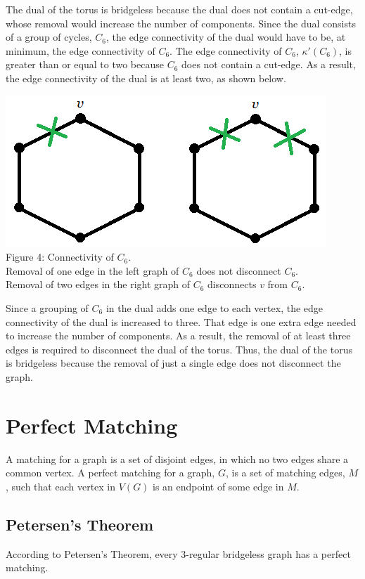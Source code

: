 \documentclass[12pt]{article}
\begin{document}
\begin{flushleft}
\medskip
The dual of the torus is bridgeless because the dual does not contain a cut-edge, whose removal would increase the number of components. Since the dual consists of a group of cycles, $C_6$, the edge connectivity of the dual would have to be, at minimum, the edge connectivity of $C_6$. The edge connectivity of $C_6$, $\kappa'(C_6)$, is greater than or equal to two because $C_6$ does not contain a cut-edge. As a result, the edge connectivity of the dual is at least two, as shown below.

\begin{center}
\includegraphics[scale=1]{images/c6connectivity.png}\\
Figure 4: Connectivity of $C_6$.\\
Removal of one edge in the left graph of $C_6$ does not disconnect $C_6$.\\
Removal of two edges in the right graph of $C_6$ disconnects $v$ from $C_6$.
\end{center}

\medskip
Since a grouping of $C_6$ in the dual adds one edge to each vertex, the edge connectivity of the dual is increased to three. That edge is one extra edge needed to increase the number of components. As a result, the removal of at least three edges is required to disconnect the dual of the torus. Thus, the dual of the torus is bridgeless because the removal of just a single edge does not disconnect the graph.

\newpage
\section*{Perfect Matching}
A matching for a graph is a set of disjoint edges, in which no two edges share a common vertex. A perfect matching for a graph, $G$, is a set of matching edges, $M$, such that each vertex in $V(G)$ is an endpoint of some edge in $M$.

\subsection*{Petersen's Theorem}
\medskip
According to Petersen's Theorem, every 3-regular bridgeless graph has a perfect matching.


\end{flushleft}
\end{document}
